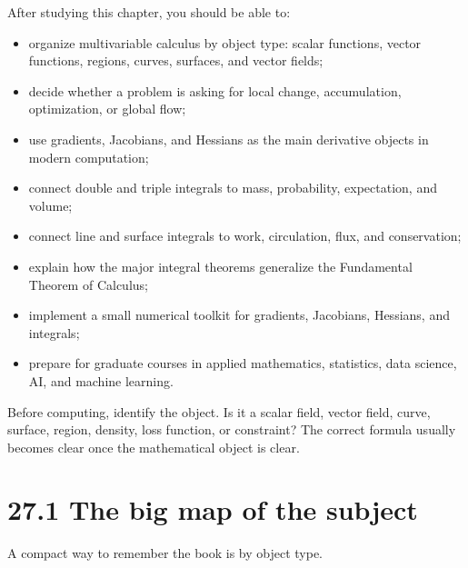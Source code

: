 \documentclass[11pt]{article}
\begin{document}
\begin{goalbox}
After studying this chapter, you should be able to:
\begin{itemize}
  \item organize multivariable calculus by object type: scalar functions, vector functions, regions, curves, surfaces, and vector fields;
  \item decide whether a problem is asking for local change, accumulation, optimization, or global flow;
  \item use gradients, Jacobians, and Hessians as the main derivative objects in modern computation;
  \item connect double and triple integrals to mass, probability, expectation, and volume;
  \item connect line and surface integrals to work, circulation, flux, and conservation;
  \item explain how the major integral theorems generalize the Fundamental Theorem of Calculus;
  \item implement a small numerical toolkit for gradients, Jacobians, Hessians, and integrals;
  \item prepare for graduate courses in applied mathematics, statistics, data science, AI, and machine learning.
\end{itemize}
\end{goalbox}

\begin{tipbox}
Before computing, identify the object. Is it a scalar field, vector field, curve, surface, region, density, loss function, or constraint? The correct formula usually becomes clear once the mathematical object is clear.
\end{tipbox}

\section*{27.1 The big map of the subject}

A compact way to remember the book is by object type.
\end{document}

